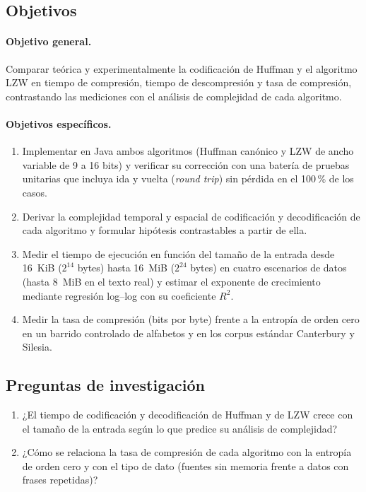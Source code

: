 \subsection{Objetivos}
\paragraph{Objetivo general.} Comparar teórica y experimentalmente la codificación de Huffman y
el algoritmo LZW en tiempo de compresión, tiempo de descompresión y tasa de compresión,
contrastando las mediciones con el análisis de complejidad de cada algoritmo.

\paragraph{Objetivos específicos.}
\begin{enumerate}[label=\textbf{OE\arabic*.}, leftmargin=*]
  \item Implementar en Java ambos algoritmos (Huffman canónico y LZW de ancho variable de 9 a
        16 bits) y verificar su corrección con una batería de pruebas unitarias que incluya
        ida y vuelta (\emph{round trip}) sin pérdida en el 100\,\% de los casos.
  \item Derivar la complejidad temporal y espacial de codificación y decodificación de cada
        algoritmo y formular hipótesis contrastables a partir de ella.
  \item Medir el tiempo de ejecución en función del tamaño de la entrada desde
        16~KiB ($2^{14}$ bytes) hasta 16~MiB ($2^{24}$ bytes) en cuatro escenarios de datos (hasta 8~MiB en el texto real) y estimar
        el exponente de crecimiento mediante regresión log--log con su coeficiente $R^2$.
  \item Medir la tasa de compresión (bits por byte) frente a la entropía de orden cero en un
        barrido controlado de alfabetos y en los corpus estándar Canterbury y Silesia.
\end{enumerate}

\subsection{Preguntas de investigación}
\begin{enumerate}[label=\textbf{RQ\arabic*.}, leftmargin=*]
  \item ¿El tiempo de codificación y decodificación de Huffman y de LZW crece con el tamaño de
        la entrada según lo que predice su análisis de complejidad?
  \item ¿Cómo se relaciona la tasa de compresión de cada algoritmo con la entropía de orden cero
        y con el tipo de dato (fuentes sin memoria frente a datos con frases repetidas)?
\end{enumerate}

